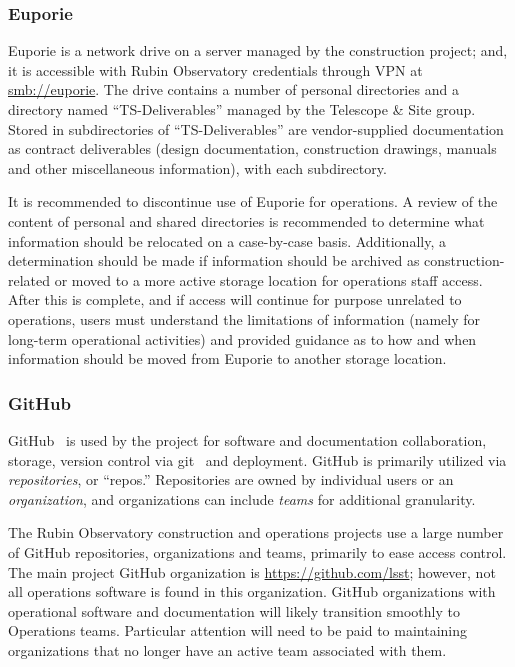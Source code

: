\subsubsection{Euporie}

Euporie is a network drive on a server managed by the construction project; and, it is accessible with Rubin Observatory credentials through VPN at \url{smb://euporie}.
The drive contains a number of personal directories and a directory named ``TS-Deliverables'' managed by the Telescope \& Site group.
Stored in subdirectories of ``TS-Deliverables'' are vendor-supplied documentation as contract deliverables (design documentation, construction drawings, manuals and other miscellaneous information), with each subdirectory.

It is recommended to discontinue use of Euporie for operations.
A review of the content of personal and shared directories is recommended to determine what information should be relocated on a case-by-case basis.
Additionally, a determination should be made if information should be archived as construction-related or moved to a more active storage location for operations staff access.
After this is complete, and if access will continue for purpose unrelated to operations, users must understand the limitations of information (namely for long-term operational activities) and provided guidance as to how and when information should be moved from Euporie to another storage location.

\subsubsection{GitHub}

GitHub\texttrademark\ \citep{GitHub-cite} is used by the project for software and documentation collaboration, storage, version control via git\texttrademark\ \citep{git-cite} and deployment.
GitHub is primarily utilized via \emph{repositories}, or ``repos.''
Repositories are owned by individual users or an \emph{organization}, and organizations can include \emph{teams} for additional granularity.

The Rubin Observatory construction and operations projects use a large number of GitHub repositories, organizations and teams, primarily to ease access control.
The main project GitHub organization is \url{https://github.com/lsst}; however, not all operations software is found in this organization.
GitHub organizations with operational software and documentation will likely transition smoothly to Operations teams.
Particular attention will need to be paid to maintaining organizations that no longer have an active team associated with them.

